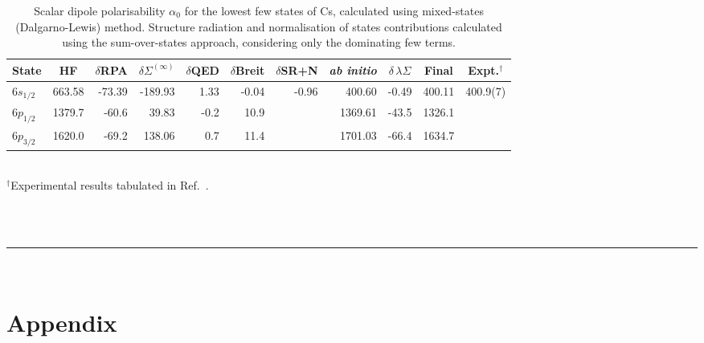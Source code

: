 \documentclass[10pt,twocolumn,a4paper]{article}%
\begin{document}
\begin{table}[p]
\centering
\caption{\small Scalar dipole polarisability $\alpha_0$ for the lowest few states of Cs, calculated using mixed-states (Dalgarno-Lewis) method. Structure radiation and normalisation of states contributions calculated using the sum-over-states approach, considering only the dominating few terms.%
\label{tab:Cs-polar}}
\begin{tabular}{l rrrrrrrr r r}
\hline
\hline   
\multicolumn{1}{c}{State}     
& \multicolumn{1}{c}{HF}       
& \multicolumn{1}{c}{$\delta$RPA}      
&\multicolumn{1}{r}{$\delta\Sigma^{(\infty)}$}
& \multicolumn{1}{c}{$\delta$QED} 
& \multicolumn{1}{c}{$\delta$Breit}
& \multicolumn{1}{c}{$\delta$SR+N}
& \multicolumn{1}{c}{\it ab initio}      
& \multicolumn{1}{c}{$\delta\,\lambda\Sigma$} 
& \multicolumn{1}{c}{Final}  
& \multicolumn{1}{c}{Expt.$^\dag$}   \\
\hline
$6s_{1/2}$ & 663.58  & -73.39 & -189.93  & 1.33  & -0.04 & -0.96 & 400.60    & -0.49   & 400.11  & 400.9(7) \\
$6p_{1/2}$ & 1379.7  & -60.6  & 39.83    & -0.2  & 10.9  &       & 1369.61   & -43.5   & 1326.1  &          \\
$6p_{3/2}$ & 1620.0  & -69.2  & 138.06   & 0.7   & 11.4  &       & 1701.03   & -66.4   & 1634.7  &          \\
\hline
\hline   
\end{tabular}\\
$^\dag${\footnotesize Experimental results tabulated in Ref.~\cite{Schwerdtfeger2014}.}
\end{table}













~\\~\\\hrule~\\
\appendix

\setcounter{equation}{0}
\setcounter{figure}{0}
\setcounter{table}{0}
\renewcommand{\theequation}{A.\arabic{equation}}
\renewcommand{\thefigure}{A.\arabic{figure}}
\renewcommand{\thetable}{A.\arabic{table}}

\section{Appendix}
\small
\end{document}
